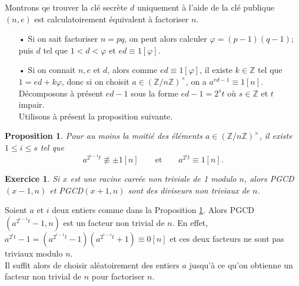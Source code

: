 \documentclass[12pt]{report}
\newtheorem*{exo}{Exercice}
\newtheorem{Prop}[thm]{Proposition}
\begin{document}
Montrons qe trouver la clé secrète $d$ uniquement à l'aide de la clé publique $(n,e)$ est calculatoirement équivalent à factoriser $n$.

\begin{itemize}
\item[•] Si on sait factoriser $n=pq$, on peut alors calculer $\varphi=(p-1)(q-1)$; puis $d$ tel que $1<d<\varphi$ et $ed \equiv 1 [\varphi]$.
\item[•] Si on connait $n,e$ et $d$, alors comme $ed \equiv 1 [\varphi]$, il existe $k \in \mathbb{Z}$ tel que $1=ed + k \varphi$, donc si on choisit $a \in (\mathbb{Z}/n\mathbb{Z})^{\times}  $, on a $a^{ed-1}\equiv 1 [n]$. Décomposons à présent $ed-1$ sous la forme $ed-1=2^s t$ où $s \in \mathbb{Z}$ et $t$ impair.\\
Utilisons à présent la proposition suivante. 
\end{itemize}

\begin{Prop}\label{p31}
Pour au moins la moitié des éléments $a \in (\mathbb{Z}/n\mathbb{Z})^{\times}$, il existe $1 \leq i \leq s  $ tel que
$$   a^{2^{i-1}t}\not \equiv \pm 1 [n] \qquad \text{et} \qquad a^{2^i t}\equiv 1 [n] .       $$
\end{Prop}

\begin{exo}
Si $x$ est une racine carrée non triviale de 1 modulo $n$, alors PGCD$(x-1,n)$ et PGCD$(x+1,n)$ sont des diviseurs non triviaux de $n$.
\end{exo}


Soient $a$ et $i$ deux entiers comme dans la Proposition \ref{p31}. Alors PGCD$(a^{2^{i-1}t}-1,n)$ est un facteur non trivial de $n$. En effet, $ a^{2^i t}-1 =(a^{2^{i-1}t}-1)(a^{2^{i-1}t}+1) \equiv 0 [n]  $ et ces deux facteurs ne sont pas triviaux modulo $n$.\\
Il suffit alors de choisir aléatoirement des entiers $a$ jusqu'à ce qu'on obtienne un facteur non trivial de $n$ pour factoriser $n$.

\bigskip
\end{document}
